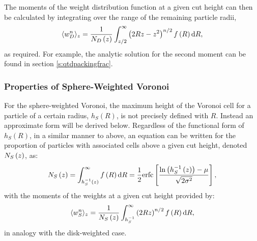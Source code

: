 The moments of the weight distribution function at a given cut height can then be calculated by integrating over the range of the remaining particle radii,
\begin{equation}
	\label{eq:wmom}
	\langle w_D^n \rangle_z = \frac{1}{N_D\left(z\right)}\int_{z/2}^\infty  \left(2Rz-z^2\right)^{n/2} f\left(R\right) \text{d} R,
\end{equation}
as required.
For example, the analytic solution for the second moment can be found in section \ref{s:qtdpackingfrac}.

\subsubsection{Properties of Sphere\--Weighted Voronoi}

For the sphere\--weighted Voronoi, the maximum height of the Voronoi cell for a particle of a certain radius, $h_S\left(R\right)$, is not precisely defined with $R$.
Instead an approximate form will be derived below.
Regardless of the functional form of $h_S\left(R\right)$, in a similar manner to above, an equation can be written for the proportion of particles with associated cells above a given cut height, denoted $N_S\left(z\right)$, as:
\begin{equation}
	\label{eq:nsz}
	N_S\left(z\right) = \int_{h_{S}^{-1}\left(z\right)}^\infty f\left(R\right) \text{d}R = \frac{1}{2}\text{erfc}\left[\frac{\ln{\left(h_{S}^{-1}\left(z\right)\right)}-\mu}{\sqrt{2\sigma^2}}\right],
\end{equation}
with the moments of the weights at a given cut height provided by:
\begin{equation}
	\label{eq:wns}
	\langle w_S^n \rangle_z = \frac{1}{N_S\left(z\right)}\int_{h_{S}^{-1}}^\infty  \left(2Rz\right)^{n/2} f\left(R\right) \text{d} R,
\end{equation}
in analogy with the disk\--weighted case.

